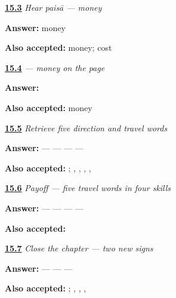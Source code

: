 \noindent\begin{minipage}[t]{\linewidth}
\raggedright
\hyperlink{review-MW-C10-hear-paisa-meaning}{\textbf{15.3}} \emph{Hear \emph{paisā} — money}\par
\small \textbf{Answer:} money\par
\footnotesize \textbf{Also accepted:} money; cost
\end{minipage}\par\medskip

\noindent\begin{minipage}[t]{\linewidth}
\raggedright
\hyperlink{review-MW-C10-paisa-dictation}{\textbf{15.4}} \emph{ — money on the page}\par
\small \textbf{Answer:} \par
\footnotesize \textbf{Also accepted:}  money
\end{minipage}\par\medskip

\noindent\begin{minipage}[t]{\linewidth}
\raggedright
\hyperlink{review-MW-R10-travel-five-recall}{\textbf{15.5}} \emph{Retrieve five direction and travel words}\par
\small \textbf{Answer:}  —  —  —  — \par
\footnotesize \textbf{Also accepted:}     ; , , , , 
\end{minipage}\par\medskip

\noindent\begin{minipage}[t]{\linewidth}
\raggedright
\hyperlink{review-MW-C10-travel-five-payoff}{\textbf{15.6}} \emph{Payoff — five travel words in four skills}\par
\small \textbf{Answer:}  —  —  —  — \par
\footnotesize \textbf{Also accepted:}     
\end{minipage}\par\medskip

\noindent\begin{minipage}[t]{\linewidth}
\raggedright
\hyperlink{review-MW-R10-script-close-recall}{\textbf{15.7}} \emph{Close the chapter — two new signs}\par
\small \textbf{Answer:}  —  —  — \par
\footnotesize \textbf{Also accepted:}    ; , , , 
\end{minipage}\par\medskip

